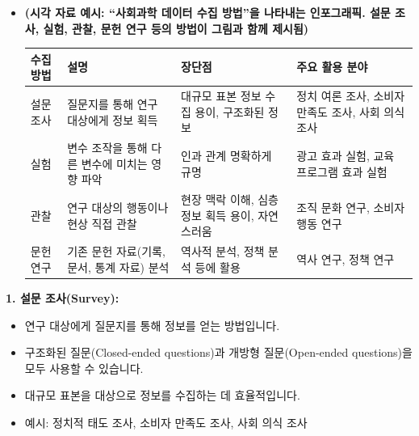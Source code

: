 \documentclass[
  letterpaper,
]{book}
\providecommand{\tightlist}{%
  \setlength{\itemsep}{0pt}\setlength{\parskip}{0pt}}
\begin{document}
\begin{itemize}
\item
  \textbf{(시각 자료 예시: ``사회과학 데이터 수집 방법''을 나타내는
  인포그래픽. 설문 조사, 실험, 관찰, 문헌 연구 등의 방법이 그림과 함께
  제시됨)}

  \begin{longtable}[]{@{}
    >{\centering\arraybackslash}p{}
    >{\centering\arraybackslash}p{}
    >{\centering\arraybackslash}p{}
    >{\centering\arraybackslash}p{}@{}}
  \toprule\noalign{}
  \begin{minipage}[b]{\linewidth}\centering
  수집 방법
  \end{minipage} & \begin{minipage}[b]{\linewidth}\centering
  설명
  \end{minipage} & \begin{minipage}[b]{\linewidth}\centering
  장단점
  \end{minipage} & \begin{minipage}[b]{\linewidth}\centering
  주요 활용 분야
  \end{minipage} \\
  \midrule\noalign{}
  \endhead
  \bottomrule\noalign{}
  \endlastfoot
  설문 조사 & 질문지를 통해 연구 대상에게 정보 획득 & 대규모 표본 정보
  수집 용이, 구조화된 정보 & 정치 여론 조사, 소비자 만족도 조사, 사회
  의식 조사 \\
  실험 & 변수 조작을 통해 다른 변수에 미치는 영향 파악 & 인과 관계
  명확하게 규명 & 광고 효과 실험, 교육 프로그램 효과 실험 \\
  관찰 & 연구 대상의 행동이나 현상 직접 관찰 & 현장 맥락 이해, 심층 정보
  획득 용이, 자연스러움 & 조직 문화 연구, 소비자 행동 연구 \\
  문헌 연구 & 기존 문헌 자료(기록, 문서, 통계 자료) 분석 & 역사적 분석,
  정책 분석 등에 활용 & 역사 연구, 정책 연구 \\
  \end{longtable}
\end{itemize}

\textbf{1. 설문 조사(Survey):}

\begin{itemize}
\tightlist
\item
  연구 대상에게 질문지를 통해 정보를 얻는 방법입니다.
\item
  구조화된 질문(Closed-ended questions)과 개방형 질문(Open-ended
  questions)을 모두 사용할 수 있습니다.
\item
  대규모 표본을 대상으로 정보를 수집하는 데 효율적입니다.
\item
  예시: 정치적 태도 조사, 소비자 만족도 조사, 사회 의식 조사
\end{itemize}
\end{document}
